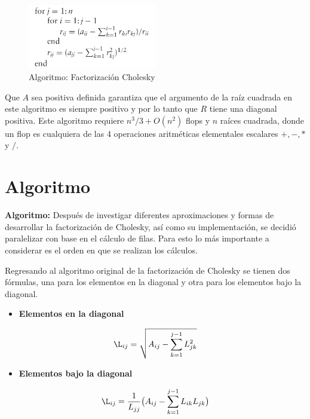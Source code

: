 \documentclass[10pt, oneside,spanish]{article}
\begin{document}
\begin{figure}[h]
    \centering
    \includegraphics[width=0.5\textwidth]{for_cycle}
    \caption{Algoritmo: Factorización Cholesky}
    \label{fig:mesh1}
\end{figure}

Que $A$ sea positiva definida garantiza que el argumento de la raíz cuadrada en este algoritmo es siempre positivo y por lo tanto que $R$ tiene una diagonal positiva. Este algoritmo requiere $n^3/{3 + O(n^2)}$ flops y $n$ raíces cuadrada, donde un flop es cualquiera de las 4 operaciones aritméticas elementales escalares $+,-,*$ y $/$. \cite{golub2012matrix}

\section{Algoritmo}
\textbf{Algoritmo:}
Después de investigar diferentes aproximaciones y formas de desarrollar la factorización de Cholesky, así como su implementación, se decidió paralelizar con base en el cálculo de filas. Para esto lo más importante a considerar es el orden en que se realizan los cálculos.

Regresando al algoritmo original de la factorización de Cholesky se tienen dos fórmulas, una para los elementos en la diagonal y otra para los elementos bajo la diagonal. \cite{higham1990analysis}


\begin{itemize}
\item \textbf{Elementos en la diagonal}
\end{itemize}

\begin{equation}
\L_{ij}=\sqrt{A_{ij} - {\displaystyle\sum_{k=1}^{j-1} L^2_{jk}}} 
\end{equation}

\begin{itemize}
\item \textbf{Elementos bajo la diagonal}
\end{itemize}

\begin{equation}
\L_{ij} = \frac{1}{L_{jj}} \big( A_{ij} - {\displaystyle\sum_{k=1}^{j-1} L_{ik}L_{jk}}\big)
\end{equation}
\end{document}
